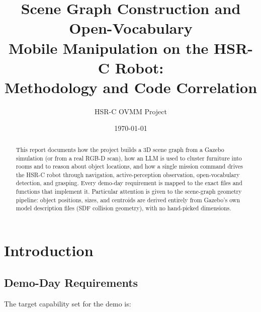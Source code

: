 \documentclass[11pt]{article}
\title{\textbf{Scene Graph Construction and Open-Vocabulary\\ Mobile Manipulation on the HSR-C Robot:\\ Methodology and Code Correlation}}
\author{HSR-C OVMM Project}
\date{\today}
\begin{document}
\maketitle

\begin{abstract}
This report documents how the project builds a 3D scene graph from a Gazebo
simulation (or from a real RGB-D scan), how an LLM is used to cluster
furniture into rooms and to reason about object locations, and how a single
mission command drives the HSR-C robot through navigation, active-perception
observation, open-vocabulary detection, and grasping. Every demo-day
requirement is mapped to the exact files and functions that implement it.
Particular attention is given to the scene-graph geometry pipeline: object
positions, sizes, and centroids are derived entirely from Gazebo's own model
description files (SDF collision geometry), with no hand-picked dimensions.
\end{abstract}

\tableofcontents
\newpage

\section{Introduction}

\subsection{Demo-Day Requirements}

The target capability set for the demo is:
\end{document}
